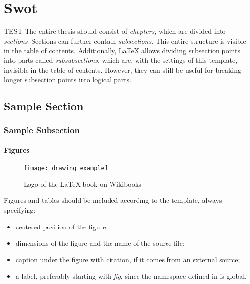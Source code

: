 \chapter{Swot}
\label{chpt:sample-chapter}

TEST
The entire thesis should consist of \emph{chapters}, which are divided
into \emph{sections}. Sections can further
contain \emph{subsections}. This entire structure is visible
in the table of contents. Additionally, LaTeX allows dividing subsection
points into parts called \emph{subsubsections}, which are, with the settings
of this template, invisible in the table of contents. However, they can still
be useful for breaking longer subsection points into logical parts.

\section{Sample Section}

\subsection{Sample Subsection}

\subsubsection{Figures}

\begin{figure}[!htb]
    \centering
    \texttt{[image: drawing\_example]}
    \caption{Logo of the LaTeX book on Wikibooks
    \cite{book:latex}}
    \label{fig:sample-figure}
\end{figure}

Figures and tables should be included according to the template, always specifying:

\begin{itemize}
    \item centered position of the figure: ;
    \item dimensions of the figure and the name of the source file;
    \item caption under the figure with citation, if it comes
    from an external source;
    \item a label, preferably starting with \emph{fig}, since
    the namespace defined in  is
    global.
\end{itemize}

